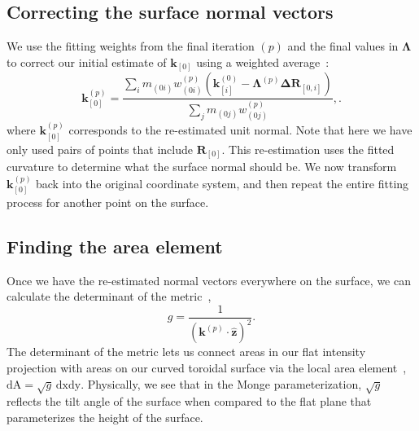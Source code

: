 \subsection{Correcting the surface normal vectors}
We use the fitting weights from the final iteration $(p)$ and the final values in $\bm{\Lambda}$ to correct our initial estimate of $\mathbf{k}_{[0]}$ using a weighted average~\cite{RN31}:
\begin{equation}
\mathbf{k}_{[0]}^{(p)} = \frac{\sum\limits_i m_{(0i)}w_{(0i)}^{(p)}(\mathbf{k}_{[i]}^{(0)} - \mathbf{\Lambda}^{(p)}\mathbf{\Delta R}_{[0,i]})}{\sum\limits_j m_{(0j)}w_{(0j)}^{(p)}},.
\end{equation}
where $\mathbf{k}_{[0]}^{(p)}$ corresponds to the re-estimated unit normal.
Note that here we have only used pairs of points that include $\mathbf{R}_{[0]}$.
This re-estimation uses the fitted curvature to determine what the surface normal should be.
We now transform $\mathbf{k}_{[0]}^{(p)}$ back into the original coordinate system, and then repeat the entire fitting process for another point on the surface.


\subsection{Finding the area element}
Once we have the re-estimated normal vectors everywhere on the surface, we can calculate the determinant of the metric~\cite{RN35},
\begin{equation}
g = \frac{1}{(\mathbf{k}^{(p)} \cdot \mathbf{\hat{z}})^2}.
\end{equation}
The determinant of the metric lets us connect areas in our flat intensity projection with areas on our curved toroidal surface via the local area element~\cite{RN35}, $\textrm{dA} = \sqrt{g} \, \textrm{dx}\textrm{dy}$.
Physically, we see that in the Monge parameterization, $\sqrt{g}$ reflects the tilt angle of the surface when compared to the flat plane that parameterizes the height of the surface.


